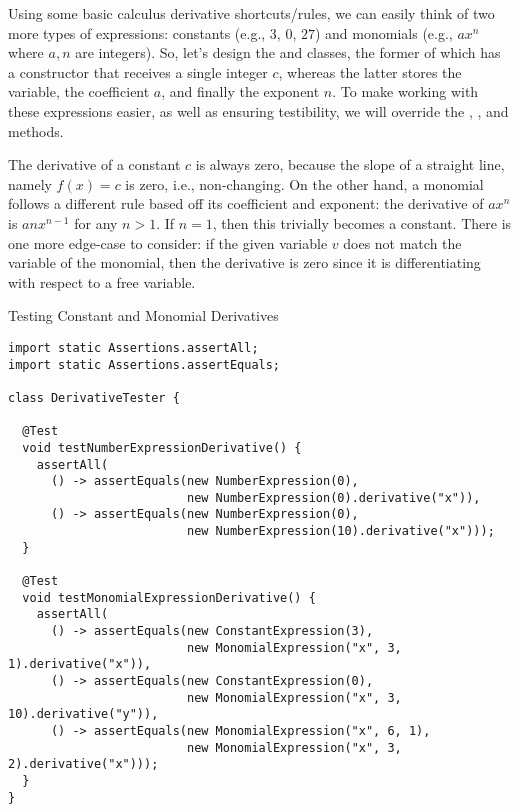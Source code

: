 Using some basic calculus derivative shortcuts/rules, we can easily think of two more types of expressions: constants (e.g., $3$, $0$, $27$) and monomials (e.g., $ax^n$ where $a, n$ are integers). So, let's design the  and  classes, the former of which has a constructor that receives a single integer $c$, whereas the latter stores the variable, the coefficient $a$, and finally the exponent $n$. To make working with these expressions easier, as well as ensuring testibility, we will override the , , and  methods.

The derivative of a constant $c$ is always zero, because the slope of a straight line, namely $f(x) = c$ is zero, i.e., non-changing. On the other hand, a monomial follows a different rule based off its coefficient and exponent: the derivative of $ax^n$ is $anx^{n-1}$ for any $n > 1$. If $n=1$, then this trivially becomes a constant. There is one more edge-case to consider: if the given variable $v$ does not match the variable of the monomial, then the derivative is zero since it is differentiating with respect to a free variable. 

\begin{cl}{Testing Constant and Monomial Derivatives}
\begin{lstlisting}[language=MyJava]
import static Assertions.assertAll;
import static Assertions.assertEquals;

class DerivativeTester {

  @Test
  void testNumberExpressionDerivative() {
    assertAll(
      () -> assertEquals(new NumberExpression(0),
                         new NumberExpression(0).derivative("x")),
      () -> assertEquals(new NumberExpression(0),
                         new NumberExpression(10).derivative("x")));
  }

  @Test
  void testMonomialExpressionDerivative() {
    assertAll(
      () -> assertEquals(new ConstantExpression(3),
                         new MonomialExpression("x", 3, 1).derivative("x")),
      () -> assertEquals(new ConstantExpression(0),
                         new MonomialExpression("x", 3, 10).derivative("y")),
      () -> assertEquals(new MonomialExpression("x", 6, 1),
                         new MonomialExpression("x", 3, 2).derivative("x")));
  }
}
\end{lstlisting}
\end{cl}

